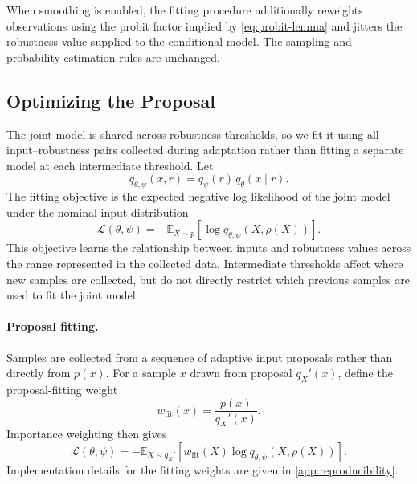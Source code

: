 \documentclass[twoside,11pt]{article}
\begin{document}
When smoothing is enabled, the fitting procedure additionally reweights observations using the probit factor implied by \cref{eq:probit-lemma} and jitters the robustness value supplied to the conditional model. The sampling and probability-estimation rules are unchanged.

\subsection{Optimizing the Proposal}
\label{sec:proposal-optimization}

The joint model is shared across robustness thresholds, so we fit it using all input--robustness pairs collected during adaptation rather than fitting a separate model at each intermediate threshold. Let
\[
    q_{\theta,\psi}(x,r)
    =
    q_{\psi}(r)\,
    q_{\theta}(x\mid r).
\]
The fitting objective is the expected negative log likelihood of the joint model under the nominal input distribution
\begin{equation}
    \label{eq:joint-fit-objective}
    \mathcal{L}(\theta,\psi)
    =
    -
    \mathbb{E}_{X\sim p}
    \left[
        \log q_{\theta,\psi}(X,\rho(X))
    \right].
\end{equation}
This objective learns the relationship between inputs and robustness values across the range represented in the collected data. Intermediate thresholds affect where new samples are collected, but do not directly restrict which previous samples are used to fit the joint model.

\paragraph{Proposal fitting.}
Samples are collected from a sequence of adaptive input proposals rather than directly from $p(x)$. For a sample $x$ drawn from proposal $q_X'(x)$, define the proposal-fitting weight
\begin{equation}
    \label{eq:fit-weight}
    w_{\mathrm{fit}}(x)
    =
    \frac{p(x)}{q_X'(x)}.
\end{equation}
Importance weighting then gives
\begin{equation}
    \label{eq:weighted-joint-fit}
    \mathcal{L}(\theta,\psi)
    =
    -
    \mathbb{E}_{X\sim q_X'}
    \left[
        w_{\mathrm{fit}}(X)
        \log q_{\theta,\psi}(X,\rho(X))
    \right].
\end{equation}
Implementation details for the fitting weights are given in \cref{app:reproducibility}.
\end{document}
